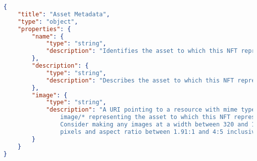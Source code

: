 \begin{lstlisting}[language=json,firstnumber=1, basicstyle=\tiny]
{
	"title": "Asset Metadata",
    "type": "object",
    "properties": {
        "name": {
            "type": "string",
            "description": "Identifies the asset to which this NFT represents"
        },
        "description": {
            "type": "string",
            "description": "Describes the asset to which this NFT represents"
        },
        "image": {
            "type": "string",
            "description": "A URI pointing to a resource with mime type
            	image/* representing the asset to which this NFT represents.
            	Consider making any images at a width between 320 and 1080
            	pixels and aspect ratio between 1.91:1 and 4:5 inclusive."
    	}
    }
}
\end{lstlisting}